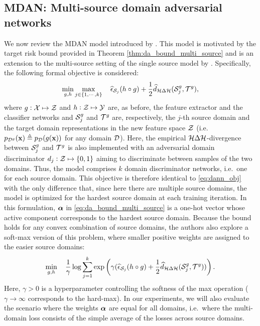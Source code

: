 \subsection{MDAN: Multi-source domain adversarial networks}
\label{sec:da_sensors_mdan}
We now review the MDAN model introduced by \citet{Zhao2018}. This model is motivated by the target risk bound provided in Theorem \ref{thm:da_bound_multi_source} and is an extension to the multi-source setting of the single source model by \citet{Ganin2015}. Specifically, the following formal objective is considered:
\begin{equation}
	\min_{g,h} \max_{j \in \{1,\cdots,k\}} \quad \widehat{\epsilon}_{{\mathcal{S}}_j}(h \circ g) + \frac{1}{2} \widehat{d}_{{\mathcal{H}} \Delta {\mathcal{H}}}({\mathcal{S}}^g_j, {\mathcal{T}}^g),
\end{equation}
where $g: {\mathcal{X}} \mapsto {\mathcal{Z}}$ and $h: {\mathcal{Z}} \mapsto {\mathcal{Y}}$ are, as before, the feature extractor and the classifier networks and ${\mathcal{S}}^g_j$ and ${\mathcal{T}}^g$ are, respectively, the $j$-th source domain and the target domain representations in the new feature space ${\mathcal{Z}}$ (i.e.\ $p_{{\mathcal{D}}^g}({\mathbf{x}}) \triangleq p_{\mathcal{D}}(g({\mathbf{x}}))$ for any domain ${\mathcal{D}}$). Here, the empirical ${\mathcal{H}} \Delta {\mathcal{H}}$-divergence between ${\mathcal{S}}^g_j$ and ${\mathcal{T}}^g$ is also implemented with an adversarial domain discriminator $d_j:{\mathcal{Z}} \mapsto \{0,1\}$ aiming to discriminate between samples of the two domains. Thus, the model comprises $k$ domain discriminator networks, i.e.\ one for each source domain. This objective is therefore identical to \eqref{eq:dann_obj} with the only difference that, since here there are multiple source domains, the model is optimized for the hardest source domain at each training iteration. In this formulation, ${\bm{\alpha}}$ in \eqref{eq:da_bound_multi_source} is a one-hot vector whose active component corresponds to the hardest source domain. Because the bound holds for any convex combination of source domains, the authors also explore a soft-max version of this problem, where smaller positive weights are assigned to the easier source domains:
\begin{equation}
\min_{g,h} \quad \frac{1}{\gamma} \log \sum_{j=1}^{k} \exp \left( \gamma( \widehat{\epsilon}_{{\mathcal{S}}_j}(h \circ g) + \frac{1}{2} \widehat{d}_{{\mathcal{H}} \Delta {\mathcal{H}}}({\mathcal{S}}^g_j, {\mathcal{T}}^g)) \right).
\end{equation}
Here, $\gamma > 0$ is a hyperparameter controlling the softness of the max operation ($\gamma \to \infty$ corresponds to the hard-max). In our experiments, we will also evaluate the scenario where the weights ${\bm{\alpha}}$ are equal for all domains, i.e.\ where the multi-domain loss consists of the simple average of the losses across source domains.

